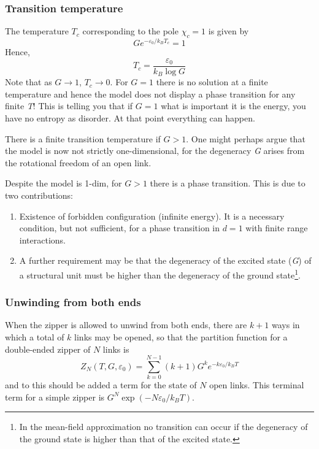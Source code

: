 \documentclass[../main/main.tex]{subfiles}
\begin{document}
\subsubsection{Transition temperature}
The temperature \( T_c \) corresponding to the pole \( \chi_c =1 \) is given by 
  \begin{equation*}
    G e^{-\varepsilon _0 /k_B T_c}  = 1
  \end{equation*}
Hence,
\begin{equation}
  T_c = \frac{\varepsilon _0}{k_B \log{G} }
  \label{eq:9_3}
\end{equation}
Note that as \( G \rightarrow 1 \), \( T_c \rightarrow 0 \). For \( G=1 \) there is no solution at a finite temperature and hence the model does not display a phase transition for any finite \emph{T}! This is telling you that if \( G=1 \) what is important it is the energy, you have no entropy as disorder. At that point everything can happen.

There is a finite transition temperature if \(G>1\). One might perhaps argue that the model is now not strictly one-dimensional, for the degeneracy \emph{G} arises from the rotational freedom of an open link.
\begin{remark}
Despite the model is 1-dim, for \( G>1 \) there is a phase transition. This is due to two contributions:
\begin{enumerate}
\item Existence of forbidden configuration (infinite energy). It is a necessary condition, but not sufficient, for a phase transition in \( d=1 \) with finite range interactions.
\item A further requirement may be that the degeneracy of the excited state (\emph{G}) of a structural unit must be higher than the degeneracy of the ground state\footnote{In the mean-field approximation no transition can occur if the degeneracy of the ground state is higher than that of the excited state.}.
\end{enumerate}
\end{remark}
\subsubsection{Unwinding from both ends}
When the zipper is allowed to unwind from both ends, there are \(k+1\) ways in which a total of \(k\) links may be opened, so that the partition function for a double-ended zipper of \(N\) links is
\begin{equation}
  Z_N (T,G, \varepsilon _0) = \sum_{k=0}^{N-1}  (k+1) G^k e^{-k \varepsilon _0/k_B T} 
\end{equation}
and to this should be added a term for the state of \(N\) open links. This terminal term for a simple zipper is \( G^N \exp(-N \varepsilon_0/ k_B T) \).
\end{document}
